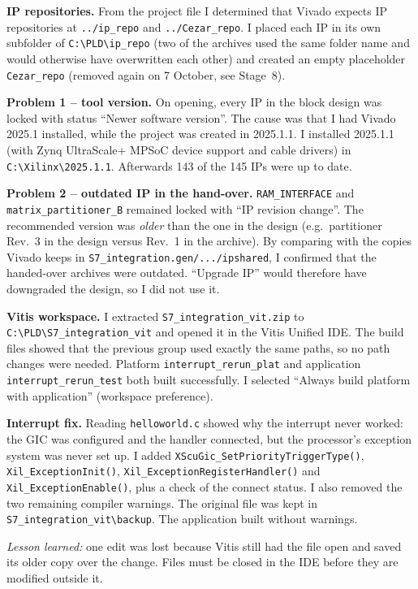 \documentclass[11pt,a4paper]{article}
\newcommand{\code}[1]{\texttt{#1}}
\begin{document}
\textbf{IP repositories.} From the project file I determined that Vivado expects IP repositories at \code{../ip\_repo} and \code{../Cezar\_repo}. I placed each IP in its own subfolder of \code{C:\textbackslash PLD\textbackslash ip\_repo} (two of the archives used the same folder name and would otherwise have overwritten each other) and created an empty placeholder \code{Cezar\_repo} (removed again on 7 October, see Stage~8).

\textbf{Problem 1 -- tool version.} On opening, every IP in the block design was locked with status ``Newer software version''. The cause was that I had Vivado 2025.1 installed, while the project was created in 2025.1.1. I installed 2025.1.1 (with Zynq UltraScale+ MPSoC device support and cable drivers) in \code{C:\textbackslash Xilinx\textbackslash 2025.1.1}. Afterwards 143 of the 145 IPs were up to date.

\textbf{Problem 2 -- outdated IP in the hand-over.} \code{RAM\_INTERFACE} and \code{matrix\_partitioner\_B} remained locked with ``IP revision change''. The recommended version was \emph{older} than the one in the design (e.g.\ partitioner Rev.~3 in the design versus Rev.~1 in the archive). By comparing with the copies Vivado keeps in \code{S7\_integration.gen/.../ipshared}, I confirmed that the handed-over archives were outdated. ``Upgrade IP'' would therefore have downgraded the design, so I did not use it.

\textbf{Vitis workspace.} I extracted \code{S7\_integration\_vit.zip} to \code{C:\textbackslash PLD\textbackslash S7\_integration\_vit} and opened it in the Vitis Unified IDE. The build files showed that the previous group used exactly the same paths, so no path changes were needed. Platform \code{interrupt\_rerun\_plat} and application \code{interrupt\_rerun\_test} both built successfully. I selected ``Always build platform with application'' (workspace preference).

\textbf{Interrupt fix.} Reading \code{helloworld.c} showed why the interrupt never worked: the GIC was configured and the handler connected, but the processor's exception system was never set up. I added \code{XScuGic\_SetPriorityTriggerType()}, \code{Xil\_ExceptionInit()}, \code{Xil\_ExceptionRegisterHandler()} and \code{Xil\_ExceptionEnable()}, plus a check of the connect status. I also removed the two remaining compiler warnings. The original file was kept in \code{S7\_integration\_vit\textbackslash backup}. The application built without warnings.

\textit{Lesson learned:} one edit was lost because Vitis still had the file open and saved its older copy over the change. Files must be closed in the IDE before they are modified outside it.
\end{document}
